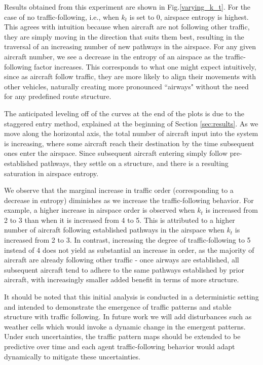 \documentclass[conference, letter]{IEEEtran}
\begin{document}
Results obtained from this experiment are shown in Fig.\ref{varying_k_t}. For the case of no traffic-following, i.e., when $k_t$ is set to 0, airspace entropy is highest. This agrees with intuition because when aircraft are not following other traffic, they are simply moving in the direction that suits them best, resulting in the traversal of an increasing number of new pathways in the airspace. For any given aircraft number, we see a decrease in the entropy of an airspace as the traffic-following factor increases. This corresponds to what one might expect intuitively, since as aircraft follow traffic, they are more likely to align their movements with other vehicles, naturally creating more pronounced ``airways" without the need for any predefined route structure. 

The anticipated leveling off of the curves at the end of the plots is due to the staggered entry method, explained at the beginning of Section \ref{sec:results}. As we move along the horizontal axis, the total number of aircraft input into the system is increasing, where some aircraft reach their destination by the time subsequent ones enter the airspace. Since subsequent aircraft entering simply follow pre-established pathways, they settle on a structure, and there is a resulting saturation in airspace entropy. 


We observe that the marginal increase in traffic order (corresponding to a decrease in entropy) diminishes as we increase the traffic-following behavior. For example, a higher increase in airspace order is observed when $k_t$ is increased from 2 to 3 than when it is increased from 4 to 5. This is attributed to a higher number of aircraft following established pathways in the airspace when $k_t$ is increased from 2 to 3. In contrast, increasing the degree of traffic-following to 5 instead of 4 does not yield as substantial an increase in order, as the majority of aircraft are already following other traffic - once airways are established, all subsequent aircraft tend to adhere to the same pathways established by prior aircraft, with increasingly smaller added benefit in terms of more structure. 

It should be noted that this initial analysis is conducted in a deterministic setting and intended to demonstrate the emergence of traffic patterns and stable structure with traffic following. In future work we will add disturbances such as weather cells which would invoke a dynamic change in the emergent patterns. Under such uncertainties, the traffic pattern maps should be extended to be predictive over time and each agent traffic-following behavior would adapt dynamically to mitigate these uncertainties. 
\end{document}
